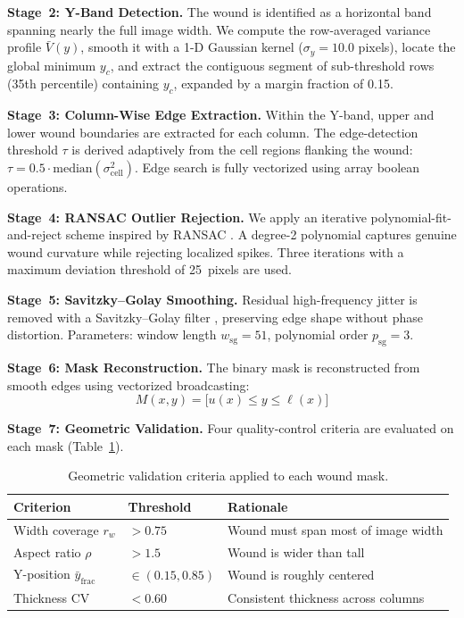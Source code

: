 \textbf{Stage~2: Y-Band Detection.}
The wound is identified as a horizontal band spanning nearly the full image width.
We compute the row-averaged variance profile $\bar{V}(y)$, smooth it with a 1-D Gaussian
kernel ($\sigma_y = 10.0$ pixels), locate the global minimum $y_c$, and extract the
contiguous segment of sub-threshold rows (35th percentile) containing $y_c$,
expanded by a margin fraction of 0.15.

\textbf{Stage~3: Column-Wise Edge Extraction.}
Within the Y-band, upper and lower wound boundaries are extracted for each column.
The edge-detection threshold $\tau$ is derived adaptively from the cell regions flanking the
wound: $\tau = 0.5 \cdot \text{median}(\sigma^2_\text{cell})$.
Edge search is fully vectorized using array boolean operations.

\textbf{Stage~4: RANSAC Outlier Rejection.}
We apply an iterative polynomial-fit-and-reject scheme inspired by RANSAC
\citep{Fischler1981}.
A degree-2 polynomial captures genuine wound curvature while rejecting localized spikes.
Three iterations with a maximum deviation threshold of 25~pixels are used.

\textbf{Stage~5: Savitzky--Golay Smoothing.}
Residual high-frequency jitter is removed with a Savitzky--Golay filter \citep{Savitzky1964},
preserving edge shape without phase distortion.
Parameters: window length $w_\text{sg} = 51$, polynomial order $p_\text{sg} = 3$.

\textbf{Stage~6: Mask Reconstruction.}
The binary mask is reconstructed from smooth edges using vectorized broadcasting:
\begin{equation}
  M(x, y) = \bigl[u(x) \leq y \leq \ell(x)\bigr] 
  \label{eq:mask-reconstruction}
\end{equation}

\textbf{Stage~7: Geometric Validation.}
Four quality-control criteria are evaluated on each mask (Table~\ref{tab:qc-criteria}).

\begin{table}[htbp]
\centering
\caption{Geometric validation criteria applied to each wound mask.}
\label{tab:qc-criteria}
\begin{tabular}{llp{6.5cm}}
\toprule
Criterion & Threshold & Rationale \\
\midrule
Width coverage $r_w$       & $> 0.75$           & Wound must span most of image width \\
Aspect ratio $\rho$         & $> 1.5$            & Wound is wider than tall \\
Y-position $\bar{y}_\text{frac}$ & $\in (0.15, 0.85)$ & Wound is roughly centered \\
Thickness CV                & $< 0.60$           & Consistent thickness across columns \\
\bottomrule
\end{tabular}
\end{table}

